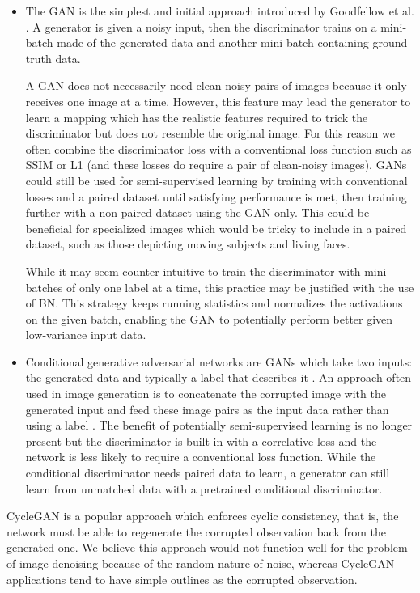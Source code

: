 \begin{itemize}
  \item The \acs{GAN} is the simplest and initial approach introduced by Goodfellow et al. \cite{gan}. A generator is given a noisy input, then the discriminator trains on a mini-batch made of the generated data and another mini-batch containing ground-truth data.

A \ac{GAN} does not necessarily need clean-noisy pairs of images because it only receives one image at a time. However, this feature may lead the generator to learn a mapping which has the realistic features required to trick the discriminator but does not resemble the original image. For this reason we often combine the discriminator loss with a conventional loss function such as SSIM or L1 (and these losses do require a pair of clean-noisy images). \acp{GAN} could still be used for semi-supervised learning by training with conventional losses and a paired dataset until satisfying performance is met, then training further with a non-paired dataset using the GAN only. This could be beneficial for specialized images which would be tricky to include in a paired dataset, such as those depicting moving subjects and living faces.

While it may seem counter-intuitive to train the discriminator with mini-batches of only one label at a time, this practice may be justified with the use of \acl{BN}. This strategy keeps running statistics and normalizes the activations on the given batch, enabling the \ac{GAN} to potentially perform better given low-variance input data. \cite{gantechniques} %
  \item Conditional generative adversarial networks are \acsp{GAN} which take two inputs: the generated data and typically a label that describes it \cite{cgan}. An approach often used in image generation is to concatenate the corrupted image with the generated input and feed these image pairs as the input data rather than using a label \cite{pix2pix}\cite{cyclegan}\cite{pix2pixhd}. The benefit of potentially semi-supervised learning is no longer present but the discriminator is built-in with a correlative loss and the network is less likely to require a conventional loss function. While the conditional discriminator needs paired data to learn, a generator can still learn from unmatched data with a pretrained conditional discriminator.
\end{itemize}
CycleGAN \cite{cyclegan} is a popular approach which enforces cyclic consistency, that is, the network must be able to regenerate the corrupted observation back from the generated one. We believe this approach would not function well for the problem of image denoising because of the random nature of noise, whereas CycleGAN applications tend to have simple outlines as the corrupted observation.

